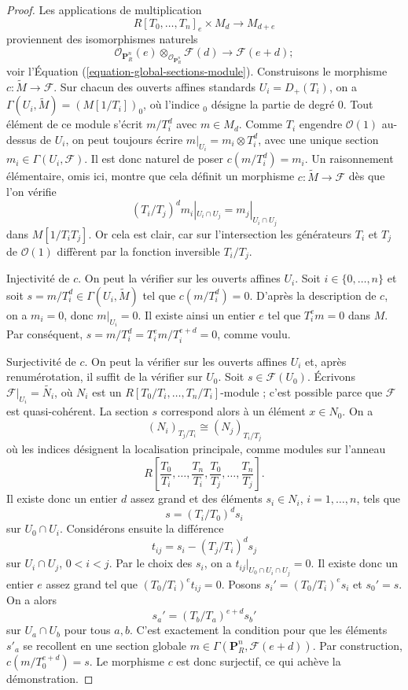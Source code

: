 \begin{proof}
Les applications de multiplication
$$
R[T_0, \ldots, T_n]_e \times M_d \longrightarrow M_{d + e}
$$
proviennent des isomorphismes naturels
$$
\mathcal{O}_{\mathbf{P}^n_R}(e)
\otimes_{\mathcal{O}_{\mathbf{P}^n_R}}
\mathcal{F}(d)
\longrightarrow
\mathcal{F}(e + d) ;
$$
voir l'Équation (\ref{equation-global-sections-module}). Construisons le
morphisme $c : \widetilde{M} \to \mathcal{F}$. Sur chacun des ouverts affines
standards $U_i = D_{+}(T_i)$, on a
$\Gamma(U_i, \widetilde{M}) = (M[1/T_i])_0$, où l'indice ${}_0$ désigne la
partie de degré $0$. Tout élément de ce module s'écrit $m/T_i^d$ avec
$m \in M_d$. Comme $T_i$ engendre $\mathcal{O}(1)$ au-dessus de $U_i$, on
peut toujours écrire $m|_{U_i} = m_i \otimes T_i^d$, avec une unique section
$m_i \in \Gamma(U_i, \mathcal{F})$. Il est donc naturel de poser
$c(m/T_i^d) = m_i$. Un raisonnement élémentaire, omis ici, montre que cela
définit un morphisme $c : \widetilde{M} \to \mathcal{F}$ dès que l'on vérifie
$$
(T_i/T_j)^d m_i|_{U_i \cap U_j} = m_j|_{U_i \cap U_j}
$$
dans $M[1/T_iT_j]$. Or cela est clair, car sur l'intersection les générateurs
$T_i$ et $T_j$ de $\mathcal{O}(1)$ diffèrent par la fonction inversible
$T_i/T_j$.

\medskip\noindent
Injectivité de $c$. On peut la vérifier sur les ouverts affines $U_i$.
Soit $i \in \{0, \ldots, n\}$ et soit
$s = m/T_i^d \in \Gamma(U_i, \widetilde{M})$ tel que
$c(m/T_i^d) = 0$. D'après la description de $c$, on a $m_i = 0$, donc
$m|_{U_i} = 0$. Il existe ainsi un entier $e$ tel que $T_i^em = 0$ dans $M$.
Par conséquent,
$s = m/T_i^d = T_i^e m/T_i^{e + d} = 0$, comme voulu.

\medskip\noindent
Surjectivité de $c$. On peut la vérifier sur les ouverts affines $U_i$ et,
après renumérotation, il suffit de la vérifier sur $U_0$.
Soit $s \in \mathcal{F}(U_0)$. Écrivons
$\mathcal{F}|_{U_i} = \widetilde{N_i}$, où $N_i$ est un
$R[T_0/T_i, \ldots, T_n/T_i]$-module ; c'est possible parce que
$\mathcal{F}$ est quasi-cohérent. La section $s$ correspond alors à un élément
$x \in N_0$. On a
$$
(N_i)_{T_j/T_i} \cong (N_j)_{T_i/T_j}
$$
où les indices désignent la localisation principale, comme modules sur
l'anneau
$$
R\left[
\frac{T_0}{T_i}, \ldots, \frac{T_n}{T_i},
\frac{T_0}{T_j}, \ldots, \frac{T_n}{T_j}
\right].
$$
Il existe donc un entier $d$ assez grand et des éléments
$s_i \in N_i$, $i = 1, \ldots, n$, tels que
$$
s = (T_i/T_0)^d s_i
$$
sur $U_0 \cap U_i$. Considérons ensuite la différence
$$
t_{ij} = s_i - (T_j/T_i)^d s_j
$$
sur $U_i \cap U_j$, $0 < i < j$. Par le choix des $s_i$, on a
$t_{ij}|_{U_0 \cap U_i \cap U_j} = 0$. Il existe donc un entier $e$ assez
grand tel que $(T_0/T_i)^et_{ij} = 0$. Posons
$s_i' = (T_0/T_i)^es_i$ et $s_0' = s$. On a alors
$$
s_a' = (T_b/T_a)^{e + d} s_b'
$$
sur $U_a \cap U_b$ pour tous $a, b$. C'est exactement la condition pour que
les éléments $s'_a$ se recollent en une section globale
$m \in \Gamma(\mathbf{P}^n_R, \mathcal{F}(e + d))$.
Par construction, $c(m/T_0^{e + d}) = s$. Le morphisme $c$ est donc surjectif,
ce qui achève la démonstration.
\end{proof}

